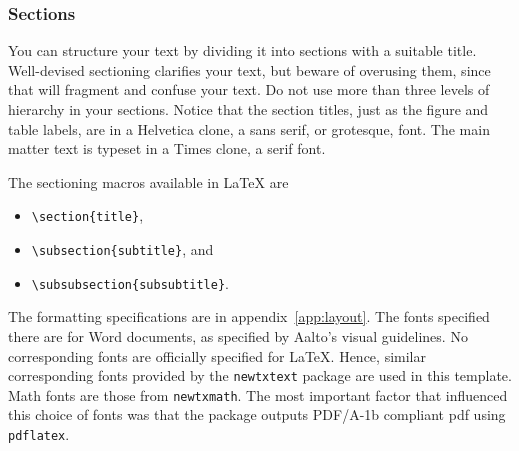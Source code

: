 \documentclass[english, 12pt, a4paper, sci, utf8, a-2b, online]{aaltothesis}
\begin{document}
\subsubsection{Sections}

You can structure your text by dividing it into sections with a suitable title. 
Well-devised sectioning clarifies your text, but beware of overusing them, since 
that will fragment and confuse your text. Do not use more than three levels of 
hierarchy in your sections. Notice that the section titles, just as the figure
and table labels, are in a Helvetica clone, a sans serif, or grotesque, font. 
The main matter text is typeset in a Times clone, a serif font.

The sectioning macros available in \LaTeX{} are 
\begin{itemize}
	\setlength{\itemsep}{0pt}
	\item[] \verb+\section{title}+,
	\item[] \verb+\subsection{subtitle}+, and
	\item[] \verb+\subsubsection{subsubtitle}+.
\end{itemize}

The formatting specifications are in appendix~\ref{app:layout}. The fonts 
specified there are for Word documents, as specified by Aalto's visual 
guidelines. No corresponding fonts are officially specified for \LaTeX{}. Hence,
similar corresponding fonts provided by the \verb+newtxtext+ package are used in
this template. Math fonts are those from \verb+newtxmath+. The most important 
factor that influenced this choice of fonts was that the package outputs 
PDF/A-1b compliant pdf using \texttt{pdflatex}.
\end{document}
